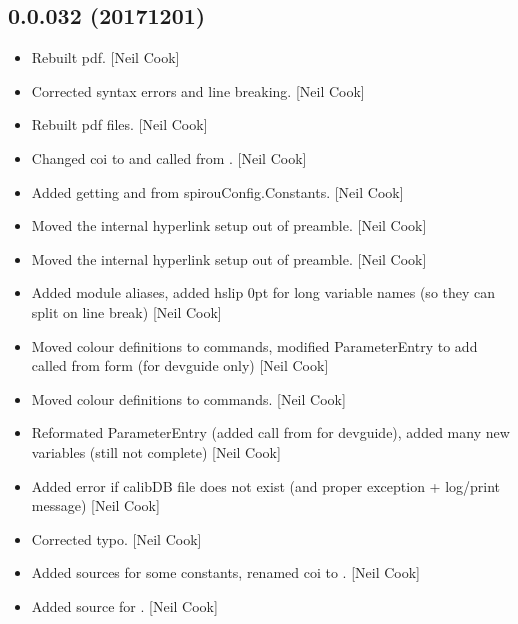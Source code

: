 \documentclass[a4paper,10pt,english]{report}
\begin{document}
\subsection{0.0.032 (2017\sphinxhyphen{}12\sphinxhyphen{}01)}
\label{\detokenize{misc/changelog:id539}}\begin{itemize}
\item {} 
Rebuilt pdf. {[}Neil Cook{]}

\item {} 
Corrected syntax errors and line breaking. {[}Neil Cook{]}

\item {} 
Rebuilt pdf files. {[}Neil Cook{]}

\item {} 
Changed coi to  and called from . {[}Neil Cook{]}

\item {} 
Added getting  and  from spirouConfig.Constants.
{[}Neil Cook{]}

\item {} 
Moved the internal hyperlink setup out of preamble. {[}Neil Cook{]}

\item {} 
Moved the internal hyperlink setup out of preamble. {[}Neil Cook{]}

\item {} 
Added module aliases, added hslip 0pt for long variable names (so they
can split on line break) {[}Neil Cook{]}

\item {} 
Moved colour definitions to commands, modified ParameterEntry to add
called from form (for devguide only) {[}Neil Cook{]}

\item {} 
Moved colour definitions to commands. {[}Neil Cook{]}

\item {} 
Reformated ParameterEntry (added call from for devguide), added many
new variables (still not complete) {[}Neil Cook{]}

\item {} 
Added error if calibDB file does not exist (and proper exception +
log/print message) {[}Neil Cook{]}

\item {} 
Corrected typo. {[}Neil Cook{]}

\item {} 
Added sources for some constants, renamed coi to . {[}Neil
Cook{]}

\item {} 
Added source for . {[}Neil Cook{]}

\end{itemize}
\end{document}
